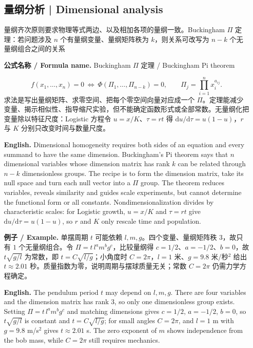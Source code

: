 \documentclass[UTF8,11pt,a4paper]{ctexart}
\newcommand{\EN}[1]{\par\noindent\textbf{English.} #1\par}
\newcommand{\FORMULA}[2]{\par\noindent\textbf{公式名称 / Formula name.} #1 / #2\par}
\newcommand{\EX}[2]{\par\noindent\textbf{例子 / Example.} #1\par\EN{#2}}
\begin{document}
\subsection{量纲分析 | Dimensional analysis}
量纲齐次原则要求物理等式两边、以及相加各项的量纲一致。Buckingham $\Pi$ 定理：若问题涉及 $n$ 个有量纲变量、量纲矩阵秩为 $k$，则关系可改写为 $n-k$ 个无量纲组合之间的关系
\FORMULA{Buckingham $\Pi$ 定理}{Buckingham Pi theorem}
\[
f(x_1,\ldots,x_n)=0\ \Longleftrightarrow\
\Phi(\Pi_1,\ldots,\Pi_{n-k})=0,\qquad
\Pi_j=\prod_{i=1}^n x_i^{a_{ij}} .
\]
求法是写出量纲矩阵、求零空间、把每个零空间向量对应成一个 $\Pi$。定理能减少变量、揭示相似性、指导缩尺实验，但不能确定函数形式或全部常数。无量纲化把变量除以特征尺度：Logistic 方程令 $u=x/K$、$\tau=rt$ 得 $\mathrm du/\mathrm d\tau=u(1-u)$，$r$ 与 $K$ 分别只改变时间与数量尺度。
\EN{Dimensional homogeneity requires both sides of an equation and every summand to have the same dimension. Buckingham's Pi theorem says that $n$ dimensional variables whose dimension matrix has rank $k$ can be related through $n-k$ dimensionless groups. The recipe is to form the dimension matrix, take its null space and turn each null vector into a $\Pi$ group. The theorem reduces variables, reveals similarity and guides scale experiments, but cannot determine the functional form or all constants. Nondimensionalization divides by characteristic scales: for Logistic growth, $u=x/K$ and $\tau=rt$ give $\mathrm du/\mathrm d\tau=u(1-u)$, so $r$ and $K$ only rescale time and population.}
\EX{单摆周期 $t$ 可能依赖 $l,m,g$。四个变量、量纲矩阵秩 $3$，故只有 $1$ 个无量纲组合。令 $\Pi=t\,l^am^bg^c$，比较量纲得 $c=1/2$、$a=-1/2$、$b=0$，故 $t\sqrt{g/l}$ 为常数，即 $t=C\sqrt{l/g}$；小角度时 $C=2\pi$，$l=1$ 米、$g=9.8$ 米/秒$^2$ 给出 $t\approx2.01$ 秒。质量指数为零，说明周期与摆球质量无关；常数 $C=2\pi$ 仍需力学方程确定。}{The pendulum period $t$ may depend on $l,m,g$. There are four variables and the dimension matrix has rank $3$, so only one dimensionless group exists. Setting $\Pi=t\,l^am^bg^c$ and matching dimensions gives $c=1/2$, $a=-1/2$, $b=0$, so $t\sqrt{g/l}$ is constant and $t=C\sqrt{l/g}$; for small angles $C=2\pi$, and $l=1$ m with $g=9.8$ m/s$^2$ gives $t\approx2.01$ s. The zero exponent of $m$ shows independence from the bob mass, while $C=2\pi$ still requires mechanics.}
\end{document}
